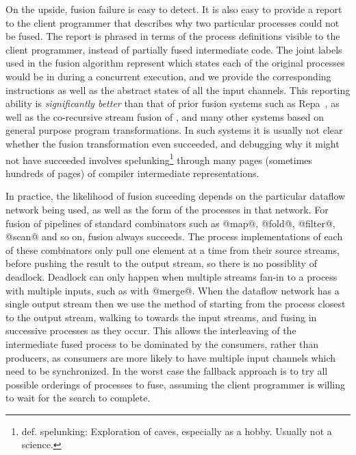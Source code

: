 On the upside, fusion failure is easy to detect. It is also easy to provide a report to the client programmer that describes why two particular processes could not be fused. The report is phrased in terms of the process definitions visible to the client programmer, instead of partially fused intermediate code. The joint labels used in the fusion algorithm represent which states each of the original processes would be in during a concurrent execution, and we provide the corresponding instructions as well as the abstract states of all the input channels. This reporting ability is \emph{significantly better} than that of prior fusion systems such as Repa~\cite{lippmeier2012guiding}, as well as the co-recursive stream fusion of \cite{coutts2007stream}, and many other systems based on general purpose program transformations. In such systems it is usually not clear whether the fusion transformation even succeeded, and debugging why it might not have succeeded involves spelunking\footnote{def. spelunking: Exploration of caves, especially as a hobby. Usually not a science.} through many pages (sometimes hundreds of pages) of compiler intermediate representations.

In practice, the likelihood of fusion suceeding depends on the particular dataflow network being used, as well as the form of the processes in that network. For fusion of pipelines of standard combinators such as @map@, @fold@, @filter@, @scan@ and so on, fusion always succeeds. The process implementations of each of these combinators only pull one element at a time from their source streams, before pushing the result to the output stream, so there is no possiblity of deadlock. Deadlock can only happen when multiple streams fan-in to a process with multiple inputs, such as with @merge@. When the dataflow network has a single output stream then we use the method of starting from the process closest to the output stream, walking to towards the input streams, and fusing in successive processes as they occur. This allows the interleaving of the intermediate fused process to be dominated by the consumers, rather than producers, as consumers are more likely to have multiple input channels which need to be synchronized. In the worst case the fallback approach is to try all possible orderings of processes to fuse, assuming the client programmer is willing to wait for the search to complete. 





